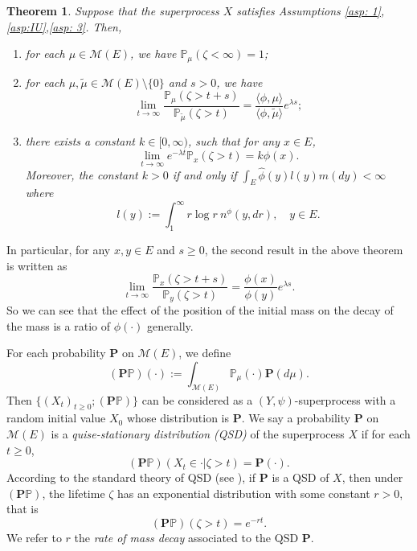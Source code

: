 \documentclass[12pt,a4paper]{amsart}
\theoremstyle{plain}
\newtheorem{thm}{Theorem}[section]
\theoremstyle{definition}
\numberwithin{equation}{section}
\begin{document}
\begin{thm}\label{thm: distribution of zeta}
	Suppose that the superprocess $X$ satisfies Assumptions \ref{asp: 1},\ref{asp:IU},\ref{asp: 3}.
	Then,
\begin{enumerate}
\item \label{subthm: extinct as sure}
	for each $\mu \in \mathcal M(E)$, we have  $\mathbb P_\mu(\zeta<\infty)=1$;
\item
 	for each $\mu,\tilde\mu\in \mathcal M(E)\setminus\{0\}$ and $s>0$, we have
 \[
 	\lim_{t\rightarrow\infty}\dfrac{\mathbb P_{\mu}(\zeta>t+s)}{\mathbb P_{\tilde\mu}(\zeta>t)}=\frac{\langle \phi,\mu\rangle }{\langle \phi,\tilde\mu\rangle }e^{\lambda s};
 \]
 \item
 	there exists a constant $k\in [0,\infty)$, such that for any $x\in E$,
\begin{equation}\label{decay rate}
	\lim_{t\rightarrow\infty} e^{-\lambda t}\mathbb P_x(\zeta>t)=k\phi(x).
\end{equation}
	Moreover, the constant $k>0$ if and only if $\int_E \hat\phi(y)l(y)m(dy)<\infty$ where
\begin{equation}\label{m}
	l(y):=\int_1^\infty r\log r~n^\phi(y, dr),\quad y \in E.
\end{equation}
\end{enumerate}
\end{thm}

	In particular, for any $x,y\in E$ and $s\geq 0$, the second result in the above theorem is written as
\begin{equation}\label{ratioresult}
 	\lim_{t\rightarrow\infty}\frac{\mathbb P_x(\zeta>t+s)}{\mathbb P_y(\zeta>t)}=\frac{\phi(x)}{\phi(y)}e^{\lambda s}.
\end{equation}
	So we can see that the effect of the position of the initial mass on the decay of the mass is a ratio of $\phi(\cdot)$ generally.


	For each probability ${\mathbf P}$ on $\mathcal M(E)$, we define
\[
	( {\mathbf P} \mathbb P)(\cdot) := \int_{\mathcal M(E)} \mathbb P_\mu(\cdot) {\mathbf P}(d\mu).
\]
	Then $\{(X_t)_{t\geq 0}; ({\mathbf P}\mathbb P)\}$ can be considered as a $(Y, \psi)$-superprocess with a random initial value $X_0$ whose distribution is ${\mathbf P}$.
	We say a probability ${\mathbf P}$ on $\mathcal M(E)$ is a \emph{quise-stationary distribution (QSD)} of the superprocess $X$ if  for each $t\geq 0$,
\[
	({\mathbf P}\mathbb P)(X_t \in \cdot | \zeta > t) ={\mathbf P}(\cdot).
\]
	According to the standard theory of QSD (see \cite{MeleardVillemonais2012Quasi-stationary}), if ${\mathbf P}$ is a QSD of $X$, then under $({\mathbf P}\mathbb P)$, the lifetime $\zeta$ has an exponential distribution with some constant $r > 0$, that is
\[
	( {\mathbf P}\mathbb P)(\zeta > t) = e^{-r t}.
\]
	We refer to $r$ the \emph{rate of mass decay} associated to the QSD $\mathbf P$.
\end{document}
